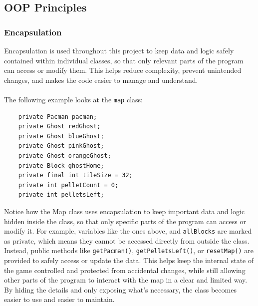 \documentclass[a4paper,5pt]{article}
\begin{document}
\subsection{OOP Principles}
\subsubsection{Encapsulation}
Encapsulation is used throughout this project to keep data and logic safely contained within individual classes, so that only relevant parts of the program can access or modify them. This helps reduce complexity, prevent unintended changes, and makes the code easier to manage and understand.\\\\ The following example looks at the \texttt{map} class:
\begin{verbatim}
    private Pacman pacman;
    private Ghost redGhost;
    private Ghost blueGhost;
    private Ghost pinkGhost;
    private Ghost orangeGhost;
    private Block ghostHome;
    private final int tileSize = 32;
    private int pelletCount = 0;
    private int pelletsLeft;
\end{verbatim}
\noindent Notice how the Map class uses encapsulation to keep important data and logic hidden inside the class, so that only specific parts of the program can access or modify it. For example, variables like the ones above, and \texttt{allBlocks} are marked as private, which means they cannot be accessed directly from outside the class. Instead, public methods like \texttt{getPacman()}, \texttt{getPelletsLeft()}, or \texttt{resetMap()} are provided to safely access or update the data. This helps keep the internal state of the game controlled and protected from accidental changes, while still allowing other parts of the program to interact with the map in a clear and limited way. By hiding the details and only exposing what’s necessary, the class becomes easier to use and easier to maintain.
\end{document}
